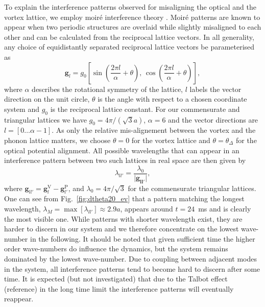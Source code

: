     To explain the interference patterns observed for misaligning the optical and the vortex lattice, we employ moir\'e interference theory \cite{SS:Kerman_jphyscon_2012}. Moir\'e patterns are known to appear when two periodic structures are overlaid while slightly misaligned to each other and can be calculated from the reciprocal lattice vectors. In all generality, any choice of equidistantly separated reciprocal lattice vectors be parameterised as
    	\begin{equation}
    		\mathbf{g}_{l} = g_0 \left[ \sin\left( \frac{2\pi l}{\alpha}+\theta \right),\, \cos\left( \frac{2\pi l}{\alpha} +\theta\right) \right],
    	\end{equation}
    where $\alpha$ describes the rotational symmetry of the lattice, $l$ labels the vector direction on the unit circle, $\theta$ is the angle with respect to a chosen coordinate system and $g_0$ is the reciprocal lattice constant. For our commensurate and triangular lattices we have $g_0=4\pi/(\sqrt{3}a)$, $\alpha=6$ and the vector directions are $l=\left[0\dots\alpha-1\right]$. As only the relative mis-alignement between the vortex and the phonon lattice matters, we choose $\theta=0$ for the vortex lattice and $\theta=\theta_\Delta$ for the optical potential alignment.
    All possible wavelengths that can appear in an interference pattern between two such lattices in real space are then given by
    	\begin{equation}
    		\lambda_{ll'} = \frac{\lambda_0}{|\mathbf{\mathbf{g}_{ll'}|}},
    		\label{eq:InterferenceVectors}
    	\end{equation}
    where
    $\mathbf{g}_{ll'}=\mathbf{g}_{l}^{\text{V}}-\mathbf{g}_{l'}^{\text{P}}$, and
    $\lambda_0 = 4\pi/\sqrt{3}$ for the commensurate triangular lattices.
    One can see from Fig.~\ref{fig:dtheta20_ev} that a pattern matching the longest wavelength, $\lambda_M= \max[\lambda_{ll'}] \approx 2.9 a$, appears around $t=24$~ms and is clearly the most visible one. While patterns with shorter wavelength exist, they are harder to discern in our system and we therefore concentrate on the lowest wave-number in the following. It should be noted that given sufficient time the higher order wave-numbers do influence the dynamics, but the system remains dominated by the lowest wave-number. Due to coupling between adjacent modes in the system, all interference patterns tend to become hard to discern after some time. It is expected (but not investigated) that due to the Talbot effect (reference) in the long time limit the interference patterns will eventually reappear.

